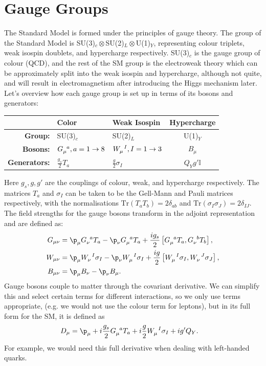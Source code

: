 \documentclass[relqm.tex]{subfiles}
\begin{document}
\section{Gauge Groups}
The Standard Model is formed under the principles of gauge theory. 
The group of the Standard Model is SU(3)$_c\otimes$SU(2)$_L\otimes$U(1)$_Y$, representing colour triplets, weak isospin doublets, and hypercharge respectively.
SU(3)$_c$ is the gauge group of colour (QCD), and the rest of the SM group is the electroweak theory which can be approximately split into the weak isospin and hypercharge, although not quite, and will result in electromagnetism after introducing the Higgs mechanism later. 
Let's overview how each gauge group is set up in terms of its bosons and generators:
\begin{table}[H]
    \centering
    \begin{tabular}{r|llc}
        \hline\hline
        & \textbf{Color} & \textbf{Weak Isospin} & \textbf{Hypercharge} \\
        \hline\hline 
        \textbf{Group:} & SU(3)$_c$ & SU(2)$_L$ & U(1)$_Y$ \\
        \textbf{Bosons:} & $\tensor{G}{_\mu^a},a=1\to8$ & $\tensor{W}{_\mu^I},I=1\to3$ & $B_\mu$ \\
        \textbf{Generators:} & $\frac{g_s}{2}T_a$ & $\frac{g}{2}\sigma_I$ & $Q_Y g'\mathbb{I}$ \\
        \hline\hline
    \end{tabular}
\end{table}
Here $g_s,g,g'$ are the couplings of colour, weak, and hypercharge respectively. 
The matrices $T_a$ and $\sigma_I$ can be taken to be the Gell-Mann and Pauli matrices respectively, with the normalisations $\text{Tr}(T_aT_b) = 2\delta_{ab}$ and $\text{Tr}(\sigma_I\sigma_J) = 2\delta_{IJ}$.
The field strengths for the gauge bosons transform in the adjoint representation and are defined as:
\begin{align}
    G_{\mu\nu} &= \p_\mu \tensor{G}{_\nu^a}T_a - \p_\nu\tensor{G}{_\mu^a}T_a + \frac{ig_s}{2}\left[\tensor{G}{_\mu^a}T_a,\tensor{G}{_\nu^b}T_b\right], \\
    W_{\mu\nu} &= \p_\mu \tensor{W}{_\nu^I}\sigma_I - \p_\nu\tensor{W}{_\mu^I}\sigma_I + \frac{ig}{2}\left[\tensor{W}{_\mu^I}\sigma_I,\tensor{W}{_\nu^J}\sigma_J\right],  \\
    B_{\mu\nu} &= \p_\mu B_\nu - \p_\nu B_\mu.
\end{align}
Gauge bosons couple to matter through the covariant derivative. 
We can simplify this and select certain terms for different interactions, so we only use terms appropriate, (e.g. we would not use the colour term for leptons), but in its full form for the SM, it is defined as
\begin{align}
    D_\mu &= \p_\mu + i\frac{g_s}{2}\tensor{G}{_\mu^a}T_a + i\frac{g}{2}\tensor{W}{_\mu^I}\sigma_I + ig'Q_Y.
\end{align}
For example, we would need this full derivative when dealing with left-handed quarks.
\end{document}
